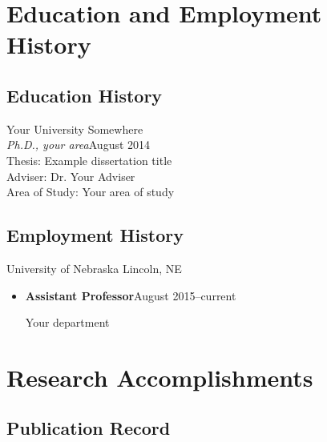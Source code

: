 \section{Education and Employment History}

\subsection{Education History}
\begin{outerdesc}
\item[Your University]\hfill Somewhere\\
  \textit{Ph.D., your area}\hfill August 2014\\
  Thesis: Example dissertation title\\
  Adviser: Dr. Your Adviser\\
  Area of Study: Your area of study

\end{outerdesc}

\subsection{Employment History}
\begin{outerdesc}


\item[University of Nebraska]\hfill Lincoln, NE
  \begin{itemize}
  \item \textbf{Assistant Professor}\hfill August 2015--current
  \item[] Your department
  \end{itemize}
\end{outerdesc}

\section{Research Accomplishments}

\subsection{Publication Record}


